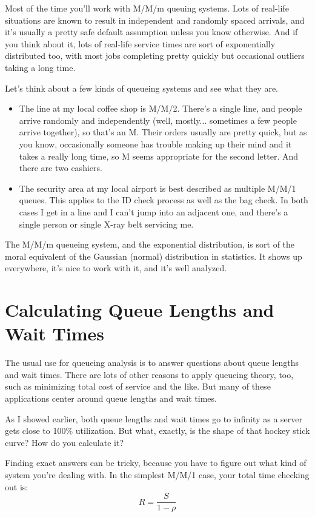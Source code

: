\documentclass{vivid_layout_pdf}
\begin{document}
Most of the time you'll work with M/M/m queuing systems. Lots of real-life situations are known to result in independent and randomly spaced arrivals, and it's usually a pretty safe default assumption unless you know otherwise. And if you think about it, lots of real-life service times are sort of exponentially distributed too, with most jobs completing pretty quickly but occasional outliers taking a long time.

Let's think about a few kinds of queueing systems and see what they are.

\begin{itemize}
\item The line at my local coffee shop is M/M/2. There's a single line, and people arrive randomly and independently (well, mostly... sometimes a few people arrive together), so that's an M. Their orders usually are pretty quick, but as you know, occasionally someone has trouble making up their mind and it takes a really long time, so M seems appropriate for the second letter. And there are two cashiers.
\item The security area at my local airport is best described as multiple M/M/1 queues. This applies to the ID check process as well as the bag check. In both cases I get in a line and I can't jump into an adjacent one, and there's a single person or single X-ray belt servicing me.
\end{itemize}

The M/M/m queueing system, and the exponential distribution, is sort of the moral equivalent of the Gaussian (normal) distribution in statistics. It shows up everywhere, it's nice to work with it, and it's well analyzed.

\section{Calculating Queue Lengths and Wait Times}

The usual use for queueing analysis is to answer questions about queue lengths and wait times. There are lots of other reasons to apply queueing theory, too, such as minimizing total cost of service and the like. But many of these applications center around queue lengths and wait times.

As I showed earlier, both queue lengths and wait times go to infinity as a server gets close to 100\% utilization. But what, exactly, is the shape of that hockey stick curve? How do you calculate it?

Finding exact answers can be tricky, because you have to figure out what kind of system you're dealing with. In the simplest M/M/1 case, your total time checking out is:
\[
  R = \frac{S}{1 - \rho}
\]
\end{document}
